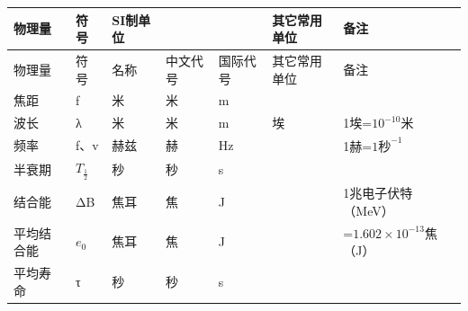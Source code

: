 {\def\LTcaptype{none} %
\begin{longtable}[]{@{}
  >{\raggedright\arraybackslash}p{}
  >{\raggedright\arraybackslash}p{}
  >{\raggedright\arraybackslash}p{}
  >{\raggedright\arraybackslash}p{}
  >{\raggedright\arraybackslash}p{}
  >{\raggedright\arraybackslash}p{}
  >{\raggedright\arraybackslash}p{}@{}}
\toprule\noalign{}
\begin{minipage}[b]{\linewidth}\raggedright
物理量
\end{minipage} & \begin{minipage}[b]{\linewidth}\raggedright
符号
\end{minipage} & \begin{minipage}[b]{\linewidth}\raggedright
SI制单位
\end{minipage} & \begin{minipage}[b]{\linewidth}\raggedright
\end{minipage} & \begin{minipage}[b]{\linewidth}\raggedright
\end{minipage} & \begin{minipage}[b]{\linewidth}\raggedright
其它常用单位
\end{minipage} & \begin{minipage}[b]{\linewidth}\raggedright
备注
\end{minipage} \\
\midrule\noalign{}
\endhead
\bottomrule\noalign{}
\endlastfoot
物理量 & 符号 & 名称 & 中文代号 & 国际代号 & 其它常用单位 & 备注 \\
焦距 & f & 米 & 米 & m & & \\
波长 & λ & 米 & 米 & m & 埃 & 1埃=\(10^{-10}\)米 \\
频率 & f、v & 赫兹 & 赫 & Hz & & 1赫=\(1\text{秒}^{-1}\) \\
半衰期 & \(T_{\frac{1}{2}}\) & 秒 & 秒 & s & & \\
结合能 & ΔB & 焦耳 & 焦 & J & & 1兆电子伏特（MeV） \\
平均结合能 & \(e_0\) & 焦耳 & 焦 & J & &
=\(1.602\times10^{-13}\)焦（J） \\
平均寿命 & τ & 秒 & 秒 & s & & \\
\end{longtable}
}

